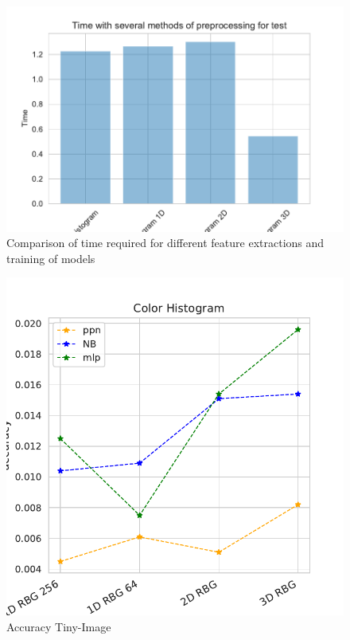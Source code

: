 \documentclass[11pt]{article}
\begin{document}
\begin{figure}[H]
\begin{minipage}[c]{0.3\textwidth}
\end{minipage}
\begin{minipage}[c]{0.3\textwidth}
\includegraphics[width=1\linewidth]{figures/Cifar/time_training_test.pdf}
\end{minipage}
\caption{Comparison of time required for different feature extractions and training of models}
\label{Cifar_time_comparison}
\end{figure}

\begin{figure}[H]
\begin{minipage}[c]{0.5\textwidth}
\includegraphics[width=1\linewidth]{figures/Tiny_Image/Accuracy_color_hist.pdf}
\end{minipage}
\caption{Accuracy Tiny-Image}
\label{Accuracy_Tiny_Image}
\end{figure}
\end{document}
